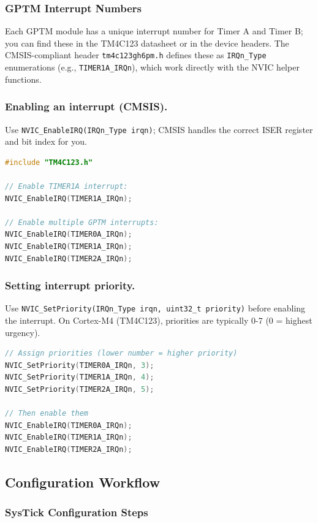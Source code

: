 \noindent


\subsubsection{GPTM Interrupt Numbers}
Each GPTM module has a unique interrupt number for Timer A and Timer B; you can find these in the TM4C123 datasheet or in the device headers. The CMSIS-compliant header \texttt{tm4c123gh6pm.h} defines these as \texttt{IRQn\_Type} enumerations (e.g., \texttt{TIMER1A\_IRQn}), which work directly with the NVIC helper functions.

\subsubsection*{Enabling an interrupt (CMSIS).}
Use \texttt{NVIC\_EnableIRQ(IRQn\_Type irqn)}; CMSIS handles the correct ISER register and bit index for you.
\begin{lstlisting}[language=C]
#include "TM4C123.h"

// Enable TIMER1A interrupt:
NVIC_EnableIRQ(TIMER1A_IRQn);

// Enable multiple GPTM interrupts:
NVIC_EnableIRQ(TIMER0A_IRQn);
NVIC_EnableIRQ(TIMER1A_IRQn);
NVIC_EnableIRQ(TIMER2A_IRQn);
\end{lstlisting}

\subsubsection*{Setting interrupt priority.}
Use \texttt{NVIC\_SetPriority(IRQn\_Type irqn, uint32\_t priority)} before enabling the interrupt. 
On Cortex-M4 (TM4C123), priorities are typically 0-7 (0 = highest urgency).
\begin{lstlisting}[language=C]
// Assign priorities (lower number = higher priority)
NVIC_SetPriority(TIMER0A_IRQn, 3);
NVIC_SetPriority(TIMER1A_IRQn, 4);
NVIC_SetPriority(TIMER2A_IRQn, 5);

// Then enable them
NVIC_EnableIRQ(TIMER0A_IRQn);
NVIC_EnableIRQ(TIMER1A_IRQn);
NVIC_EnableIRQ(TIMER2A_IRQn);
\end{lstlisting}




\subsection{Configuration Workflow}

\subsubsection{SysTick Configuration Steps}


